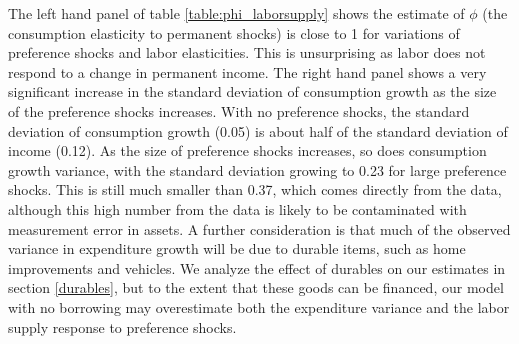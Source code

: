 The left hand panel of table \ref{table:phi_laborsupply} shows the estimate of $\phi$ (the consumption elasticity to permanent shocks) is close to 1 for variations of preference shocks and labor elasticities. This is unsurprising as labor does not respond to a change in permanent income. The right hand panel shows a very significant increase in the standard deviation of consumption growth as the size of the preference shocks increases. With no preference shocks, the standard deviation of consumption growth (0.05) is about half of the standard deviation of income (0.12). As the size of preference shocks increases, so does consumption growth variance, with the standard deviation growing to 0.23 for large preference shocks. This is still much smaller than 0.37, which comes directly from the data, although this high number from the data is likely to be contaminated with measurement error in assets. A further consideration is that much of the observed variance in expenditure growth will be due to durable items, such as home improvements and vehicles. We analyze the effect of durables on our estimates in section \ref{durables}, but to the extent that these goods can be financed, our model with no borrowing may overestimate both the expenditure variance and the labor supply response to preference shocks.

